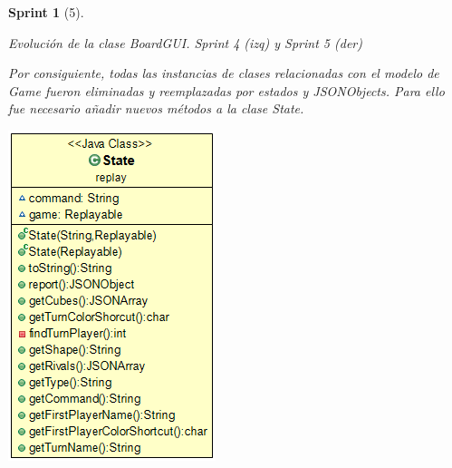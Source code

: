 \documentclass{article}
\theoremstyle{break}
\newtheorem*{sprint}{Sprint}
\begin{document}
\begin{sprint}[5]
\begin{center}
Evolución de la clase \textit{BoardGUI}. Sprint 4 (izq) y Sprint 5 (der)
\end{center}

Por consiguiente, todas las instancias de clases relacionadas con el modelo de \textit{Game} fueron eliminadas y reemplazadas por estados y JSONObjects. Para ello fue necesario añadir nuevos métodos a la clase \textit{State}.

\begin{center}
\includegraphics[scale=0.5]{state-sprint5.png}
\end{center}

\end{sprint}
\end{document}
